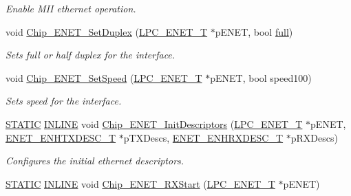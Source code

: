 \begin{DoxyCompactItemize}
\begin{DoxyCompactList}\small\item\em Enable M\+II ethernet operation. \end{DoxyCompactList}\item 
void \hyperlink{group___e_n_e_t__18_x_x__43_x_x_ga2e8f77b5b0c703d2dd0cb039dcc2a10c}{Chip\+\_\+\+E\+N\+E\+T\+\_\+\+Set\+Duplex} (\hyperlink{struct_l_p_c___e_n_e_t___t}{L\+P\+C\+\_\+\+E\+N\+E\+T\+\_\+T} $\ast$p\+E\+N\+ET, bool \hyperlink{full_8c_a7e4918bd9b26c2056ccbfe647c4a4328}{full})
\begin{DoxyCompactList}\small\item\em Sets full or half duplex for the interface. \end{DoxyCompactList}\item 
void \hyperlink{group___e_n_e_t__18_x_x__43_x_x_gafbae19c1935ad1a8f5ac17ddc7e186e1}{Chip\+\_\+\+E\+N\+E\+T\+\_\+\+Set\+Speed} (\hyperlink{struct_l_p_c___e_n_e_t___t}{L\+P\+C\+\_\+\+E\+N\+E\+T\+\_\+T} $\ast$p\+E\+N\+ET, bool speed100)
\begin{DoxyCompactList}\small\item\em Sets speed for the interface. \end{DoxyCompactList}\item 
\hyperlink{group___l_p_c___types___public___macros_ga10b2d890d871e1489bb02b7e70d9bdfb}{S\+T\+A\+T\+IC} \hyperlink{spifi__18xx__43xx_8h_a2eb6f9e0395b47b8d5e3eeae4fe0c116}{I\+N\+L\+I\+NE} void \hyperlink{group___e_n_e_t__18_x_x__43_x_x_ga11da2fb0538560adec98ab13199aa267}{Chip\+\_\+\+E\+N\+E\+T\+\_\+\+Init\+Descriptors} (\hyperlink{struct_l_p_c___e_n_e_t___t}{L\+P\+C\+\_\+\+E\+N\+E\+T\+\_\+T} $\ast$p\+E\+N\+ET, \hyperlink{struct_e_n_e_t___e_n_h_t_x_d_e_s_c___t}{E\+N\+E\+T\+\_\+\+E\+N\+H\+T\+X\+D\+E\+S\+C\+\_\+T} $\ast$p\+T\+X\+Descs, \hyperlink{struct_e_n_e_t___e_n_h_r_x_d_e_s_c___t}{E\+N\+E\+T\+\_\+\+E\+N\+H\+R\+X\+D\+E\+S\+C\+\_\+T} $\ast$p\+R\+X\+Descs)
\begin{DoxyCompactList}\small\item\em Configures the initial ethernet descriptors. \end{DoxyCompactList}\item 
\hyperlink{group___l_p_c___types___public___macros_ga10b2d890d871e1489bb02b7e70d9bdfb}{S\+T\+A\+T\+IC} \hyperlink{spifi__18xx__43xx_8h_a2eb6f9e0395b47b8d5e3eeae4fe0c116}{I\+N\+L\+I\+NE} void \hyperlink{group___e_n_e_t__18_x_x__43_x_x_ga1c12c6420ce2ddf9db02cae9a6a85cd5}{Chip\+\_\+\+E\+N\+E\+T\+\_\+\+R\+X\+Start} (\hyperlink{struct_l_p_c___e_n_e_t___t}{L\+P\+C\+\_\+\+E\+N\+E\+T\+\_\+T} $\ast$p\+E\+N\+ET)

\end{DoxyCompactItemize}
